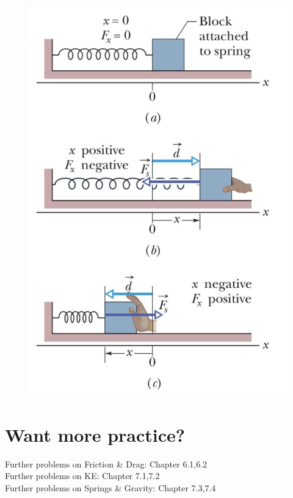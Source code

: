 \documentclass[11pt]{article}
\begin{document}
\begin{figure}[h]
\includegraphics[scale=0.4]{2021-W5-Q3-2}
\end{figure}

\section*{Want more practice?}
\small
Further problems on Friction \& Drag: Chapter 6.1,6.2 \\
Further problems on KE: Chapter 7.1,7.2 \\
Further problems on Springs \& Gravity: Chapter 7.3,7.4 \\
\end{document}
